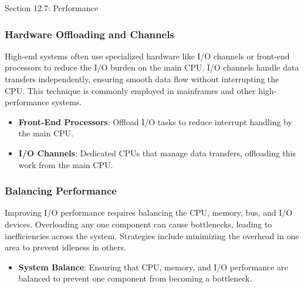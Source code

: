 \begin{notes}{Section 12.7: Performance}
\begin{highlight}
    \end{highlight}
    
    \subsubsection*{Hardware Offloading and Channels}
    
    High-end systems often use specialized hardware like I/O channels or front-end processors to reduce the I/O burden on the main CPU. I/O channels handle data transfers independently, ensuring smooth 
    data flow without interrupting the CPU. This technique is commonly employed in mainframes and other high-performance systems.
    
    \begin{highlight}
    
        \begin{itemize}
            \item \textbf{Front-End Processors}: Offload I/O tasks to reduce interrupt handling by the main CPU.
            \item \textbf{I/O Channels}: Dedicated CPUs that manage data transfers, offloading this work from the main CPU.
        \end{itemize}
    
    \end{highlight}
    
    \subsubsection*{Balancing Performance}
    
    Improving I/O performance requires balancing the CPU, memory, bus, and I/O devices. Overloading any one component can cause bottlenecks, leading to inefficiencies across the system. Strategies include 
    minimizing the overhead in one area to prevent idleness in others.
    
    \begin{highlight}
    
        \begin{itemize}
            \item \textbf{System Balance}: Ensuring that CPU, memory, and I/O performance are balanced to prevent one component from becoming a bottleneck.
        \end{itemize}
    
    \end{highlight}
    

\end{notes}
